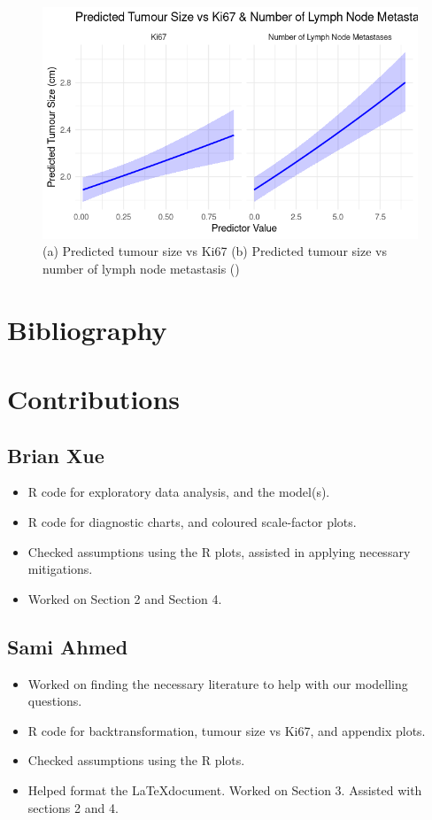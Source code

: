 \documentclass[letter]{article}
\begin{document}
\begin{figure}[hbt!]
        \centering
        \includegraphics[width=\textwidth]{PTS_LNM.png}
        \caption{(a) Predicted tumour size vs Ki67 (b) Predicted tumour size vs number of lymph node metastasis (\cite{Min2021})}
\end{figure}

\clearpage

\section{Bibliography}

\printbibliography

\newpage 

\section{Contributions}

\subsection{Brian Xue}
\begin{itemize}
    \item R code for exploratory data analysis, and the model(s).
    \item R code for diagnostic charts, and coloured scale-factor plots.
    \item Checked assumptions using the R plots, assisted in applying necessary mitigations.
    \item Worked on Section 2 and Section 4.
\end{itemize}
\subsection{Sami Ahmed}
\begin{itemize}
    \item Worked on finding the necessary literature to help with our modelling questions.
    \item R code for backtransformation, tumour size vs Ki67, and appendix plots.
    \item Checked assumptions using the R plots.
    \item Helped format the \LaTeX document. Worked on Section 3. Assisted with sections 2 and 4.   
\end{itemize}
\end{document}

